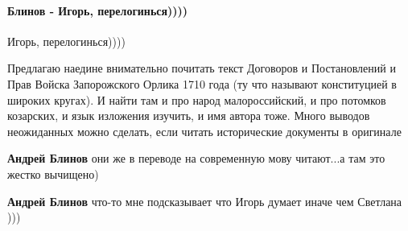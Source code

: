  
 
 
 
 
\paragraph{Блинов - Игорь, перелогинься))))}
\label{sec:14_07_2021.fb.krjukova_svetlana.1.statja_putina_mnenie.cmt.blinov_igor_perelogin}

\begin{itemize}
 

Игорь, перелогинься))))

Предлагаю наедине внимательно почитать текст Договоров и Постановлений и Прав
Войска Запорожского Орлика 1710 года (ту что называют конституцией в широких
кругах). И найти там и про народ малороссийский, и про потомков козарских, и
язык изложения изучить, и имя автора тоже. Много выводов неожиданных можно
сделать, если читать исторические документы в оригинале

\begin{itemize}
 
\textbf{Андрей Блинов} они же в переводе на современную мову читают...а там это жестко вычищено)

 
\textbf{Андрей Блинов} что-то мне подсказывает что Игорь думает иначе чем Светлана )))

 

\end{itemize}
\end{itemize}
